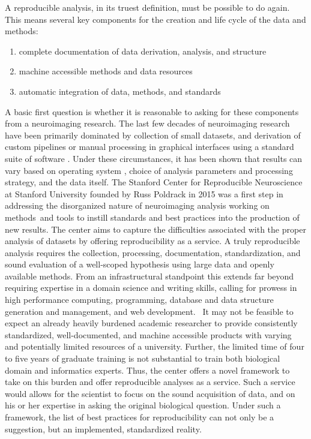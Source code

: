 \documentclass{report}
\begin{document}
A reproducible analysis, in its truest definition, must be possible to
do again. This means several key components for the creation and life
cycle of the data and methods:

\begin{enumerate}
\item
  complete documentation of data derivation, analysis, and structure
\item
  machine accessible methods and data resources
\item
  automatic integration of data, methods, and standards 
\end{enumerate}

A basic first question is whether it is reasonable to asking for these
components from a neuroimaging research. The last few decades of
neuroimaging research have been primarily dominated by collection of
small datasets, and derivation of custom pipelines or manual processing
in graphical interfaces using a standard suite of software \cite{Liou2003-ue,Jenkinson2012-pr}.
Under these circumstances, it has been shown that results can vary based
on operating system \cite{Glatard2015-fn},
choice of analysis parameters and processing strategy, and the data
itself. The Stanford Center for Reproducible Neuroscience at Stanford
University \cite{noauthor_undated-it} founded
by Russ Poldrack in 2015 was a first step in addressing the disorganized
nature of neuroimaging analysis working on methods~and tools to instill
standards and best practices \cite{Gorgolewski2015-gu} into
the production of new results. The center aims to capture the
difficulties associated with the proper analysis of datasets by offering
reproducibility as a service. A truly reproducible analysis requires the
collection, processing, documentation, standardization, and sound
evaluation of a well-scoped hypothesis using large data and openly
available methods. From an infrastructural standpoint this extends far
beyond requiring expertise in a domain science and writing skills,
calling for prowess in high performance computing, programming, database
and data structure generation and management, and web development. ~It
may not be feasible to expect an already heavily burdened academic
researcher to provide consistently standardized, well-documented, and
machine accessible products with varying and potentially limited
resources of a university. Further, the limited time of four to five
years of graduate training is not substantial to train both biological
domain and informatics experts. Thus, the center offers a novel
framework to take on this burden and offer reproducible analyses as a
service. Such a service would allows for the scientist to focus on the
sound acquisition of data, and on his or her expertise in asking the
original biological question. Under such a framework, the list of best
practices for reproducibility can not only be a suggestion, but an
implemented, standardized reality.
\end{document}
